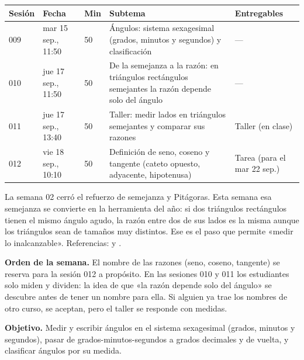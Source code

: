 \documentclass[11pt]{article}
\begin{document}
\encabezado*

\begin{center}
{\renewcommand{\arraystretch}{1.3}
\begin{tabularx}{\linewidth}{@{}l l l X l@{}}
  \toprule
  \textbf{Sesión} & \textbf{Fecha} & \textbf{Min} & \textbf{Subtema} & \textbf{Entregables}\\
  \midrule
  009 & mar 15 sep., 11:50 & 50 & Ángulos: sistema sexagesimal (grados, minutos y
      segundos) y clasificación & ---\\
  010 & jue 17 sep., 11:50 & 50 & De la semejanza a la razón: en triángulos rectángulos
      semejantes la razón depende solo del ángulo & ---\\
  011 & jue 17 sep., 13:40 & 50 & Taller: medir lados en triángulos semejantes y comparar
      sus razones & Taller (en clase)\\
  012 & vie 18 sep., 10:10 & 50 & Definición de seno, coseno y tangente (cateto opuesto,
      adyacente, hipotenusa) & Tarea (para el mar 22 sep.)\\
  \bottomrule
\end{tabularx}}
\end{center}

La semana 02 cerró el refuerzo de semejanza y Pitágoras. Esta semana esa semejanza se
convierte en la herramienta del año: si dos triángulos rectángulos tienen el mismo ángulo
agudo, la razón entre dos de sus lados es la misma aunque los triángulos sean de tamaños
muy distintos. Ese es el paso que permite «medir lo inalcanzable».
Referencias:  y .

\begin{nota}
\textbf{Orden de la semana.} El nombre de las razones (seno, coseno, tangente) se reserva
para la sesión 012 a propósito. En las sesiones 010 y 011 los estudiantes solo miden y
dividen: la idea de que «la razón depende solo del ángulo» se descubre antes de tener un
nombre para ella. Si alguien ya trae los nombres de otro curso, se aceptan, pero el taller
se responde con medidas.
\end{nota}


\textbf{Objetivo.} Medir y escribir ángulos en el sistema sexagesimal (grados, minutos y
segundos), pasar de grados-minutos-segundos a grados decimales y de vuelta, y clasificar
ángulos por su medida.
\end{document}
